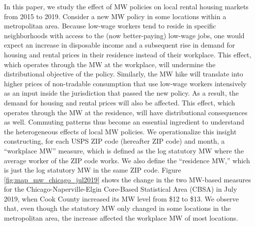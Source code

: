 In this paper, we study the effect of MW policies on local rental housing 
markets from 2015 to 2019.
Consider a new MW policy in some locations within a metropolitan area.
Because low-wage workers tend to reside in specific neighborhoods with access 
to the (now better-paying) low-wage jobs,
one would expect an increase in disposable income and a subsequent rise in demand 
for housing and rental prices in their residence instead of their workplace.
This effect, which operates through the MW at the workplace, 
will undermine the distributional objective of the policy.
Similarly, the MW hike will translate into higher prices of non-tradable 
consumption that use low-wage workers intensively as an input inside the 
jurisdiction that passed the new policy.
As a result, the demand for housing and rental prices will also be affected.
This effect, which operates through the MW at the residence, will have 
distributional consequences as well.
Commuting patterns thus become an essential ingredient to understand the 
heterogeneous effects of local MW policies.
We operationalize this insight constructing, for each USPS ZIP code (hereafter 
ZIP code) and month,
a ``workplace MW'' measure, which is defined as the log statutory MW where
the average worker of the ZIP code works.
We also define the ``residence MW,'' which is just the log statutory MW in the
same ZIP code.
Figure \ref{fig:map_mw_chicago_jul2019} shows the change in the two MW-based 
measures for the Chicago-Naperville-Elgin Core-Based Statistical Area (CBSA) in 
July 2019, when Cook County increased its MW level from \$12 to \$13.
We observe that, even though the statutory MW only changed in some locations in
the metropolitan area, the increase affected the workplace MW of most locations.


